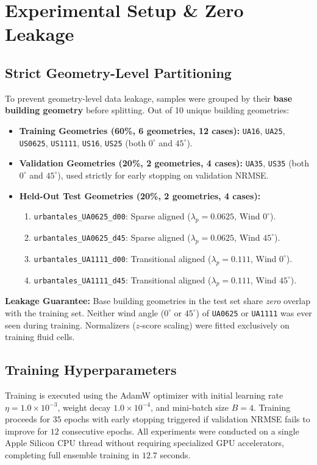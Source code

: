 \documentclass[10pt,twocolumn]{article}
\begin{document}
\section{Experimental Setup & Zero Leakage}
\subsection{Strict Geometry-Level Partitioning}
To prevent geometry-level data leakage, samples were grouped by their \textbf{base building geometry} before splitting. Out of 10 unique building geometries:
\begin{itemize}
    \item \textbf{Training Geometries (60\%, 6 geometries, 12 cases):} \texttt{UA16}, \texttt{UA25}, \texttt{US0625}, \texttt{US1111}, \texttt{US16}, \texttt{US25} (both $0^\circ$ and $45^\circ$).
    \item \textbf{Validation Geometries (20\%, 2 geometries, 4 cases):} \texttt{UA35}, \texttt{US35} (both $0^\circ$ and $45^\circ$), used strictly for early stopping on validation NRMSE.
    \item \textbf{Held-Out Test Geometries (20\%, 2 geometries, 4 cases):}
    \begin{enumerate}
        \item \texttt{urbantales\_UA0625\_d00}: Sparse aligned ($\lambda_p = 0.0625$, Wind $0^\circ$).
        \item \texttt{urbantales\_UA0625\_d45}: Sparse aligned ($\lambda_p = 0.0625$, Wind $45^\circ$).
        \item \texttt{urbantales\_UA1111\_d00}: Transitional aligned ($\lambda_p = 0.111$, Wind $0^\circ$).
        \item \texttt{urbantales\_UA1111\_d45}: Transitional aligned ($\lambda_p = 0.111$, Wind $45^\circ$).
    \end{enumerate}
\end{itemize}
\textbf{Leakage Guarantee:} Base building geometries in the test set share \textit{zero} overlap with the training set. Neither wind angle ($0^\circ$ or $45^\circ$) of \texttt{UA0625} or \texttt{UA1111} was ever seen during training. Normalizers ($z$-score scaling) were fitted exclusively on training fluid cells.

\subsection{Training Hyperparameters}
Training is executed using the AdamW optimizer with initial learning rate $\eta = 1.0 \times 10^{-3}$, weight decay $1.0 \times 10^{-4}$, and mini-batch size $B = 4$. Training proceeds for $35$ epochs with early stopping triggered if validation NRMSE fails to improve for $12$ consecutive epochs. All experiments were conducted on a single Apple Silicon CPU thread without requiring specialized GPU accelerators, completing full ensemble training in $12.7$ seconds.
\end{document}
